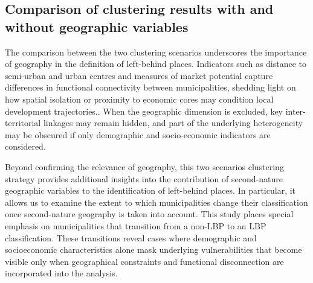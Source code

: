 \documentclass[a4paper,11pt,oneside]{article}
\begin{document}
\subsection{Comparison of clustering results with and without geographic variables}



The comparison between the two clustering scenarios underscores the importance of geography in the definition of left-behind places. Indicators such as distance to semi-urban and urban centres and measures of market potential capture differences in functional connectivity between municipalities, shedding light on how spatial isolation or proximity to economic cores may condition local development trajectories.\citep{connor2024gets}. When the geographic dimension is excluded, key inter-territorial linkages may remain hidden, and part of the underlying heterogeneity may be obscured if only demographic and socio-economic indicators are considered.

Beyond confirming the relevance of geography, this two scenarios clustering strategy provides additional insights into the contribution of second-nature geographic variables to the identification of left-behind places. In particular, it allows us to examine the extent to which municipalities change their classification once second-nature geography is taken into account. This study places special emphasis on municipalities that transition from a non-LBP to an LBP classification. These transitions reveal cases where demographic and socioeconomic characteristics alone mask underlying vulnerabilities that become visible only when geographical constraints and functional disconnection are incorporated into the analysis.
\end{document}
